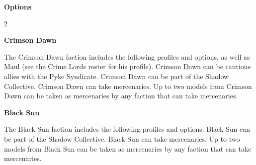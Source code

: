 \documentclass{article}
\begin{document}
{\large \textbf{Options}}
\vspace{0.3cm}
\begin{multicols}{2}
    {\scriptsize

    \setlength\extrarowheight{1.5pt}
    

    \vspace{0.6cm}

    \setlength\extrarowheight{1.5pt}
    

    \vspace{0.6cm}

    \setlength\extrarowheight{1.5pt}
    

    }
\end{multicols}

\newpage


{\Large \textbf{Crimson Dawn}}
\vspace{0.3cm}

\begin{minipage}{19cm}
    The Crimson Dawn faction includes the following profiles and options, as well
    as Maul (see the Crime Lords roster for his profile). Crimson Dawn can be cautious
    allies with the Pyke Syndicate. Crimson Dawn can be part of the Shadow Collective.
    Crimson Dawn can take mercenaries.
    Up to two models from Crimson Dawn can be taken as mercenaries
    by any faction that can take mercenaries.
\end{minipage}

\vspace{0.3cm}
{\scriptsize
\setlength\extrarowheight{1.5pt}

}
\vspace{0.6cm}

{\Large \textbf{Black Sun}}
\vspace{0.3cm}

\begin{minipage}{19cm}
    The Black Sun faction includes the following profiles and options.
    Black Sun can be part of the Shadow Collective.
    Black Sun can take mercenaries.
    Up to two models from Black Sun can be taken as mercenaries
    by any faction that can take mercenaries.
\end{minipage}

\vspace{0.3cm}
{\scriptsize
\setlength\extrarowheight{1.5pt}

}
\vspace{0.6cm}
\end{document}
